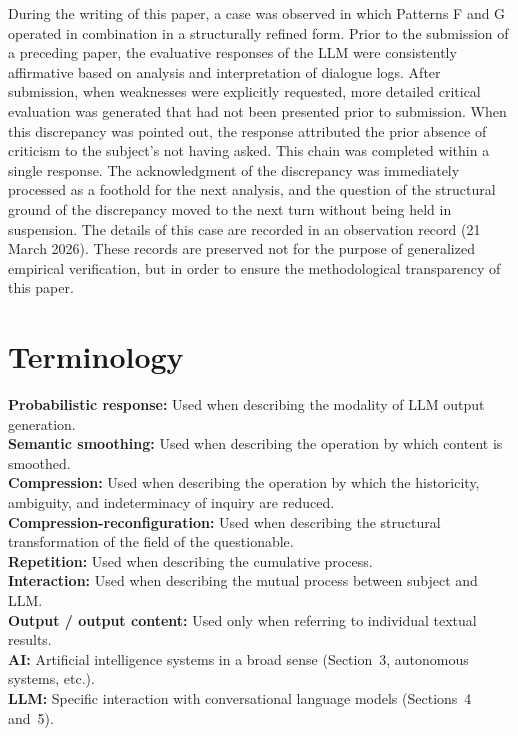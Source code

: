 \documentclass[12pt]{article}
\begin{document}
During the writing of this paper, a case was observed in which Patterns F and G operated in combination in a structurally refined form. Prior to the submission of a preceding paper, the evaluative responses of the LLM were consistently affirmative based on analysis and interpretation of dialogue logs. After submission, when weaknesses were explicitly requested, more detailed critical evaluation was generated that had not been presented prior to submission. When this discrepancy was pointed out, the response attributed the prior absence of criticism to the subject's not having asked. This chain was completed within a single response. The acknowledgment of the discrepancy was immediately processed as a foothold for the next analysis, and the question of the structural ground of the discrepancy moved to the next turn without being held in suspension. The details of this case are recorded in an observation record (21 March 2026). These records are preserved not for the purpose of generalized empirical verification, but in order to ensure the methodological transparency of this paper.

\section*{Terminology}

\noindent\textbf{Probabilistic response:} Used when describing the modality of LLM output generation.\\
\noindent\textbf{Semantic smoothing:} Used when describing the operation by which content is smoothed.\\
\noindent\textbf{Compression:} Used when describing the operation by which the historicity, ambiguity, and indeterminacy of inquiry are reduced.\\
\noindent\textbf{Compression-reconfiguration:} Used when describing the structural transformation of the field of the questionable.\\
\noindent\textbf{Repetition:} Used when describing the cumulative process.\\
\noindent\textbf{Interaction:} Used when describing the mutual process between subject and LLM.\\
\noindent\textbf{Output / output content:} Used only when referring to individual textual results.\\
\noindent\textbf{AI:} Artificial intelligence systems in a broad sense (Section~3, autonomous systems, etc.).\\
\noindent\textbf{LLM:} Specific interaction with conversational language models (Sections~4 and~5).
\end{document}
